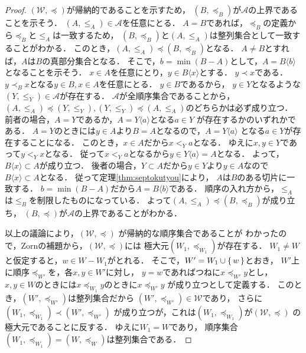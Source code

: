 \begin{proof}
     $(\mathscr{W} , { \preceq})$が帰納的であることを示すため，
     $(B, {\preceq_B})$が$\mathscr{A}$の上界であることを示そう．
     $(A, { \leq_A}) \in \mathscr{A}$を任意にとる．
     $A=B$であれば，$\preceq_B$の定義から$\preceq_B$と$\leq_A$は一致するため，
     $(B, {\preceq_B})$と$(A, {\leq_A})$は整列集合として一致することがわかる．
     このとき，$(A ,{\leq_A}) \preceq (B , {\preceq_B})$となる．
     $A \neq B$とすれば，$A$は$B$の真部分集合となる．
     そこで，$b = \min (B -A)$として，$A = B \langle b \rangle$となることを示そう．
     $x \in A$を任意にとり，$y \in B \langle x \rangle$とする．
     $y \prec x$である．
     $y \prec_B x$となる$y \in B , x \in A$を任意にとる．
     $y \in B$であるから，
     $y \in Y$となるような$(Y , {\leq_Y}) \in \mathscr{A}$が存在する．
     $\mathscr{A}$が全順序集合であることから，
     $(A , {\leq_A} ) \preceq (Y ,{\leq_Y}) , 
     ( Y , {\leq_Y}) \preceq  (A , {\leq_A})$のどちらかは必ず成り立つ．
     前者の場合，$A=Y$であるか，$A = Y \langle a \rangle$となる$a \in Y$
     が存在するかのいずれかである．
     $A=Y$のときには$y \in A$より$B=A$となるので，$A= Y \langle a \rangle$
     となる$a \in Y$が存在することになる．
     このとき，$x \in A$だから$x <_Y a$となる．
     ゆえに$x,y \in Y$であって$y <_Y x$となる．
     従って$x<_Y a$となるから$y \in Y \langle a \rangle =A $となる．
     よって，$B \langle x \rangle \subset A$が成り立つ．
     後者の場合，$Y \subset A$だから$y \in Y$より$y \in A$なので
     $B \langle x \rangle \subset A$となる．
     従って定理\ref{thm:septokutyou}により，
     $A$は$B$のある切片に一致する．
     $b = \min ( B -A)$だから$A= B \langle b \rangle $である．
     順序の入れ方から，$\leq_A$は$\leq _B$を制限したものになっている．
     よって$(A , {\leq_A}) \preceq (B , {\preceq_B})$が成り立ち，
     $(B, {\preceq})$が$\mathscr{A}$の上界であることがわかる．

     以上の議論により，$(\mathscr{W} , { \preceq})$
     が帰納的な順序集合であることが
     わかったので，Zornの補題から，$(\mathscr{W}, { \preceq})$には
     極大元$(W_1, { \preceq_{W_1}})$が存在する．
     $W_1 \neq W$と仮定すると，$w \in W-W _1$がとれる．
     そこで，$W' = W_1 \cup \set{w}$とおき，
     $W'$上に順序$\preceq_{W'}$を，各$x , y \in W'$に対し，
     $y=w$であればつねに$x \preceq _{W'} y$とし，
     $x,y \in W$のときには$x \preceq_{W_1} y$のときに$x \preceq_{W'} y$
     が成り立つとして定義する．
     このとき，$(W' , {\preceq_{W'}})$は整列集合だから
     $(W' , {\preceq_{W'}}) \in \mathscr{W}$であり，
     さらに$(W_1, { \preceq_{W_1}}) \prec (W' , { \preceq_{W'}})$
     が成り立つが，これは$(W_1, {\preceq_{W_1}})$が$(\mathscr{W} , {\preceq})$
     の極大元であることに反する．
     ゆえに$W_1=W$であり，
     順序集合$(W_1, {\preceq_{W_1}})=(W, {\preceq_W})$は整列集合である．
   \end{proof}

